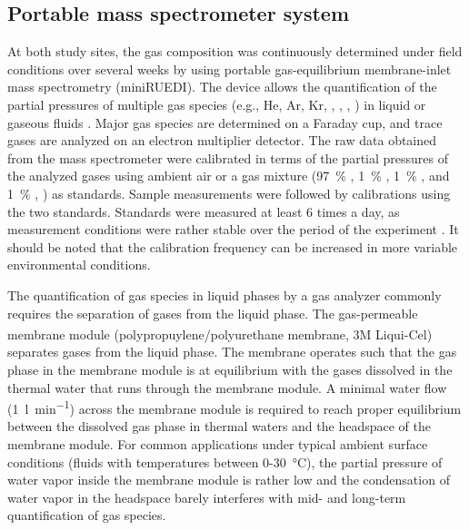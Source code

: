 \subsection{Portable mass spectrometer system}
At both study sites, the gas composition was continuously determined under field conditions over several weeks by using portable gas-equilibrium membrane-inlet mass spectrometry (miniRUEDI).
The device allows the quantification of the partial pressures of multiple gas species (e.g., He, Ar, Kr, , , , ) in liquid or gaseous fluids \citep{brennwald2016portable}.
Major gas species are determined on a Faraday cup, and trace gases are analyzed on an electron multiplier detector.
The raw data obtained from the mass spectrometer were calibrated in terms of the partial pressures of the analyzed gases using ambient air \citep{porcelli2018noblegases} or a gas mixture (\SI{97}{\percent} , \SI{1}{\percent} , \SI{1}{\percent} , and \SI{1}{\percent} , \cite{tomonaga2019montterri}) as standards. 
Sample measurements were followed by calibrations using the two standards.
Standards were measured at least 6 times a day, as measurement conditions were rather stable over the period of the experiment \citep{brennwald2016portable}.
It should be noted that the calibration frequency can be increased in more variable environmental conditions.

The quantification of gas species in liquid phases by a gas analyzer commonly requires the separation of gases from the liquid phase. 
The gas-permeable membrane module (polypropuylene/polyurethane membrane, 3M\textsuperscript{\texttrademark} Liqui-Cel\textsuperscript{\texttrademark}) separates gases from the liquid phase.
The membrane operates such that the gas phase in the membrane module is at equilibrium with the gases dissolved in the thermal water that runs through the membrane module. 
A minimal water flow (\SI{1}{\litre\per\minute}) across the membrane module is required to reach proper equilibrium between the dissolved gas phase in thermal waters and the headspace of the membrane module. 
For common applications under typical ambient surface conditions (fluids with temperatures between 0-\SI{30}{\celsius}), the partial pressure of water vapor inside the membrane module is rather low and the condensation of water vapor in the headspace barely interferes with mid- and long-term quantification of gas species.

